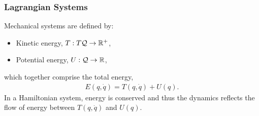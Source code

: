 \documentclass{beamer}
\newcommand{\sQ}{\mathcal{Q}}
\begin{document}
\begin{frame}
  \frametitle{Lagrangian Systems}
  Mechanical systems are defined by:
  \begin{itemize}
  \item Kinetic energy, $T : T\sQ \to \R^+$,\\
  \item  Potential energy, $U : \sQ \to \R$,
  \end{itemize}
  which together comprise the total energy,
  \begin{align*}
    E(q, \dot q) = T(q, \dot q) + U(q).
  \end{align*}
  In a Hamiltonian system, energy is conserved and thus the dynamics reflects the flow of energy between $T(q, \dot q)$ and $U(q)$.
\end{frame}
\end{document}
